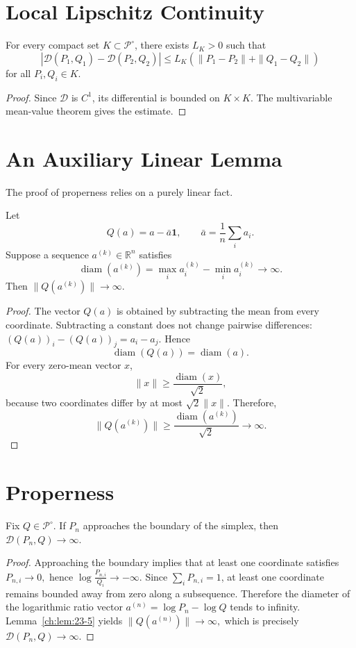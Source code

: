 \section{Local Lipschitz Continuity}\label{ch:sec:local-lipschitz-continuity}
\begin{theorem}
\label{ch:thm:23-4}
For every compact set \(K\subset\mathcal P^\circ\), there exists
\(L_K>0\) such that
\[ |\mathcal D(P_1,Q_1)-\mathcal D(P_2,Q_2)|
\le L_K(\|P_1-P_2\|+\|Q_1-Q_2\|) \]
for all \(P_i,Q_i\in K\).
\end{theorem}
\begin{proof} Since \(\mathcal D\) is \(C^{1}\), its differential is
bounded on \(K\times K\). The multivariable mean-value theorem
gives the estimate. 
\end{proof}
\section{An Auxiliary Linear Lemma}\label{ch:sec:an-auxiliary-linear-lemma}
The proof of properness relies on a purely linear fact.
\begin{lemma}
\label{ch:lem:23-5}
Let
\[ Q(a)=a-\bar a\mathbf 1, \qquad
\bar a=\frac1n\sum_i a_i. \]
Suppose a sequence \(a^{(k)}\in\mathbb R^n\) satisfies
\[ \operatorname{diam}(a^{(k)}) = \max_i
a_i^{(k)}-\min_i a_i^{(k)}
\longrightarrow\infty. \]
Then
$\|Q(a^{(k)})\|\longrightarrow\infty.$
\end{lemma}
\begin{proof} The vector \(Q(a)\) is obtained by subtracting the mean from
every coordinate. Subtracting a constant does not change pairwise
differences:
$(Q(a))_i-(Q(a))_j=a_i-a_j.$
Hence
\[ \operatorname{diam}(Q(a)) = \operatorname{diam}(a). \]
For every zero-mean vector \(x\),
\[ \|x\| \ge \frac{\operatorname{diam}(x)}{\sqrt 2}, \]
because two coordinates differ by at most \(\sqrt 2\|x\|\).
Therefore,
\[ \|Q(a^{(k)})\| \ge
\frac{\operatorname{diam}(a^{(k)})}{\sqrt 2}
\longrightarrow\infty. \]
\end{proof}
\section{Properness}\label{ch:sec:properness}
\begin{theorem}[Properness]
\label{ch:thm:23-6}
Fix \(Q\in\mathcal P^\circ\). If \(P_n\) approaches
the boundary of the simplex, then
$\mathcal D(P_n,Q)\to\infty.$
\end{theorem}
\begin{proof} Approaching the boundary implies that at least one coordinate
satisfies
$P_{n,i}\to0,$
hence
$\log\frac{P_{n,i}}{Q_i}\to-\infty.$
Since \(\sum_i P_{n,i}=1\), at least one coordinate remains bounded
away from zero along a subsequence. Therefore the diameter of the
logarithmic ratio vector
$a^{(n)}=\log P_n-\log Q$
tends to infinity. Lemma~\ref{ch:lem:23-5} yields
$\|Q(a^{(n)})\|\to\infty,$ which is precisely \(\mathcal D(P_n,Q)\to\infty\). 
\end{proof}
